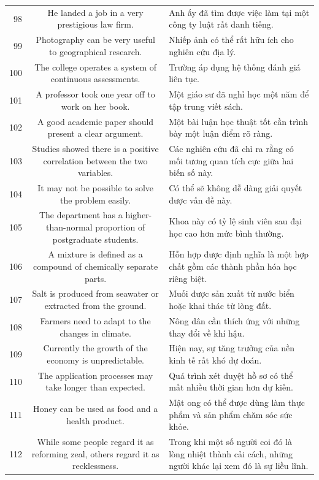 \documentclass[11pt,a4paper]{article}
\begin{document}
\begin{longtable}{N S M}
98 & He landed a job in a very prestigious law firm. & Anh ấy đã tìm được việc làm tại một công ty luật rất danh tiếng. \\
99 & Photography can be very useful to geographical research. & Nhiếp ảnh có thể rất hữu ích cho nghiên cứu địa lý. \\
100 & The college operates a system of continuous assessments. & Trường áp dụng hệ thống đánh giá liên tục. \\
101 & A professor took one year off to work on her book. & Một giáo sư đã nghỉ học một năm để tập trung viết sách. \\
102 & A good academic paper should present a clear argument. & Một bài luận học thuật tốt cần trình bày một luận điểm rõ ràng. \\
103 & Studies showed there is a positive correlation between the two variables. & Các nghiên cứu đã chỉ ra rằng có mối tương quan tích cực giữa hai biến số này. \\
104 & It may not be possible to solve the problem easily. & Có thể sẽ không dễ dàng giải quyết được vấn đề này. \\
105 & The department has a higher-than-normal proportion of postgraduate students. & Khoa này có tỷ lệ sinh viên sau đại học cao hơn mức bình thường. \\
106 & A mixture is defined as a compound of chemically separate parts. & Hỗn hợp được định nghĩa là một hợp chất gồm các thành phần hóa học riêng biệt. \\
107 & Salt is produced from seawater or extracted from the ground. & Muối được sản xuất từ ​​nước biển hoặc khai thác từ lòng đất. \\
108 & Farmers need to adapt to the changes in climate. & Nông dân cần thích ứng với những thay đổi về khí hậu. \\
109 & Currently the growth of the economy is unpredictable. & Hiện nay, sự tăng trưởng của nền kinh tế rất khó dự đoán. \\
110 & The application processes may take longer than expected. & Quá trình xét duyệt hồ sơ có thể mất nhiều thời gian hơn dự kiến. \\
111 & Honey can be used as food and a health product. & Mật ong có thể được dùng làm thực phẩm và sản phẩm chăm sóc sức khỏe. \\
112 & While some people regard it as reforming zeal, others regard it as recklessness. & Trong khi một số người coi đó là lòng nhiệt thành cải cách, những người khác lại xem đó là sự liều lĩnh. \\

\end{longtable}
\end{document}
